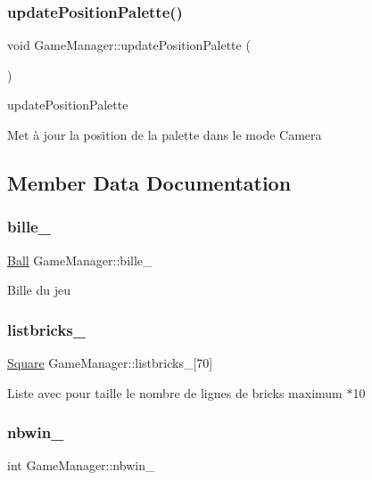 \subsubsection{\texorpdfstring{update\+Position\+Palette()}{updatePositionPalette()}}
{\footnotesize\ttfamily void Game\+Manager\+::update\+Position\+Palette (\begin{DoxyParamCaption}{ }\end{DoxyParamCaption})}



update\+Position\+Palette 

Met à jour la position de la palette dans le mode Camera 

\subsection{Member Data Documentation}
\mbox{\label{class_game_manager_a3c6413d0d78b839784ed4960d82d8501}} 
\subsubsection{\texorpdfstring{bille\+\_\+}{bille\_}}
{\footnotesize\ttfamily \mbox{\hyperlink{class_ball}{Ball}} Game\+Manager\+::bille\+\_\+}

Bille du jeu \mbox{\label{class_game_manager_a1f4d4e5f73f424ba4d04492e2b38cb88}} 
\subsubsection{\texorpdfstring{listbricks\+\_\+}{listbricks\_}}
{\footnotesize\ttfamily \mbox{\hyperlink{class_square}{Square}} Game\+Manager\+::listbricks\+\_\+\mbox{[}70\mbox{]}}

Liste avec pour taille le nombre de lignes de bricks maximum $\ast$10 \mbox{\label{class_game_manager_ac69eb2bd39346ff2c5304c6af93a6406}} 
\subsubsection{\texorpdfstring{nbwin\+\_\+}{nbwin\_}}
{\footnotesize\ttfamily int Game\+Manager\+::nbwin\+\_\+}

